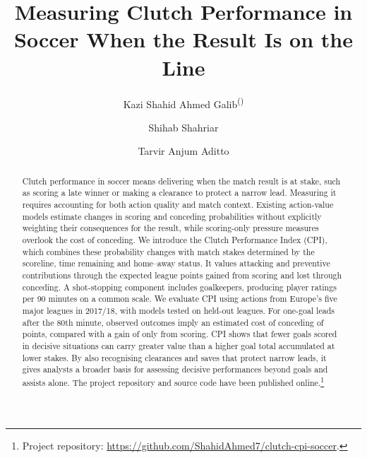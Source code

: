 \documentclass[runningheads]{llncs}
\begin{document}
\title{Measuring Clutch Performance in Soccer When the Result Is on the Line}
\author{Kazi Shahid Ahmed Galib\textsuperscript{(\Letter)} \and
Shihab Shahriar \and
Tarvir Anjum Aditto}
\maketitle

\begin{abstract}
Clutch performance in soccer means delivering when the match result is at stake, such as scoring a late winner or making a clearance to protect a narrow lead. Measuring it requires accounting for both action quality and match context. Existing action-value models estimate changes in scoring and conceding probabilities without explicitly weighting their consequences for the result, while scoring-only pressure measures overlook the cost of conceding. We introduce the Clutch Performance Index (CPI), which combines these probability changes with match stakes determined by the scoreline, time remaining and home--away status. It values attacking and preventive contributions through the expected league points gained from scoring and lost through conceding. A shot-stopping component includes goalkeepers, producing player ratings per 90 minutes on a common scale. We evaluate CPI using \nActions{} actions from Europe's five major leagues in 2017/18, with models tested on held-out leagues. For one-goal leads after the 80th minute, observed outcomes imply an estimated cost of conceding of \realCost{} points, compared with a gain of only \realGain{} from scoring. CPI shows that fewer goals scored in decisive situations can carry greater value than a higher goal total accumulated at lower stakes. By also recognising clearances and saves that protect narrow leads, it gives analysts a broader basis for assessing decisive performances beyond goals and assists alone. The project repository and source code have been published online.\footnote{Project repository: \url{https://github.com/ShahidAhmed7/clutch-cpi-soccer}.}
\end{abstract}
\end{document}
